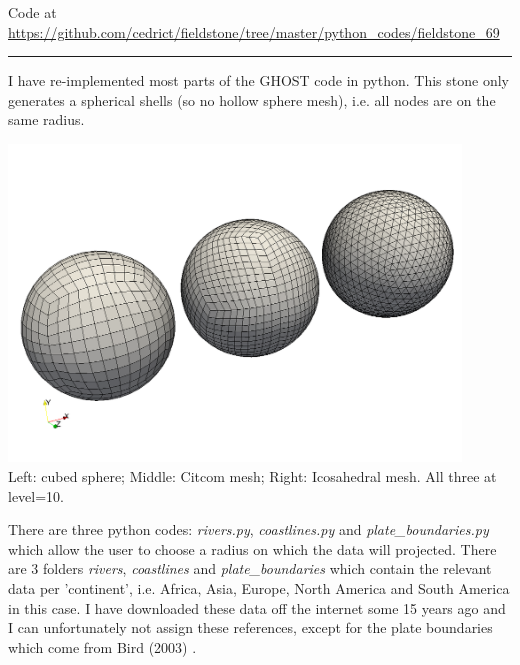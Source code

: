 


\begin{center}
Code at \url{https://github.com/cedrict/fieldstone/tree/master/python_codes/fieldstone_69}
\end{center}

\par\noindent\rule{\textwidth}{0.4pt}

I have re-implemented most parts of the GHOST code \cite{thie18} in python. 
This stone only generates a spherical shells (so no hollow sphere mesh), 
i.e. all nodes are on the same radius. 

\begin{center}
\includegraphics[width=12cm]{python_codes/fieldstone_69/images/shells}\\
{\captionfont Left: cubed sphere; Middle: Citcom mesh; Right: Icosahedral mesh. 
All three at level=10.}
\end{center}

There are three python codes: {\sl rivers.py}, {\sl coastlines.py} and {\sl plate\_boundaries.py} which allow the user to choose 
a radius on which the data will projected. There are 3 folders {\sl rivers}, {\sl coastlines} and {\sl plate\_boundaries} which contain the relevant data per 'continent', i.e. 
Africa, Asia, Europe, North America and South America in this case. 
I have downloaded these data off the internet some 15 years ago and I can unfortunately not assign these references, except 
for the plate boundaries which come from Bird (2003) \cite{bird03}.

